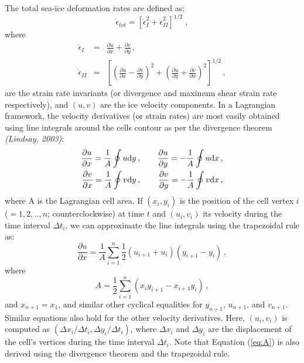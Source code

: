 \documentclass[12pt]{article}
\begin{document}
The total sea-ice deformation rates are defined as:
\begin{equation}
\dot{\epsilon}_{tot} = \left[ \dot{\epsilon}^2_{I}+\dot{\epsilon}^2_{II} \right]^{1/2} \;,
\end{equation}
where 
\begin{eqnarray}
\dot{\epsilon}_{I} &= &\frac{\partial u}{\partial x}+\frac{\partial v}{\partial y} \, , \label{eq:eps_I} \\
\dot{\epsilon}_{II} &= &\left[ \left( \frac{\partial u}{\partial x} - \frac{\partial v}{\partial y}\right)^{2} + \left( \frac{\partial u}{\partial y} + \frac{\partial v}{\partial x}\right)^{2}   \right]^{1/2} \, , \label{eq:eps_II} 
\end{eqnarray}
are the strain rate invariants (or divergence and maximum shear strain rate respectively), and $(u,v)$ are the ice velocity components. In a Lagrangian framework, the velocity derivatives (or strain rates) are most easily obtained using line integrals around the cells contour as per the divergence theorem \textit{(Lindsay, 2003)}: 
\begin{eqnarray}
\frac{\partial u}{\partial x}  = \frac{1}{A}\oint u \textrm{d}y \, ,&  \hspace{0.4cm} & \frac{\partial u}{\partial y}  = -\frac{1}{A}\oint u \textrm{d}x \, , \nonumber \\
\frac{\partial v}{\partial x}  = \frac{1}{A}\oint v \textrm{d}y \, ,&  \hspace{0.4cm}  & \frac{\partial v}{\partial y}  = -\frac{1}{A}\oint v \textrm{d}x\, ,
\label{eq:dudx}
\end{eqnarray}
where A is the Lagrangian cell area. If $(x_{i}, y_{i})$ is the position of the cell vertex $i$ ($=1,2,..,n$; counterclockwise) at time $t$ and $(u_{i}, v_{i})$ its velocity during the time interval $\Delta t_{i}$, we can approximate the line integrals using the trapezoidal rule as:
\begin{equation}
\frac{\partial u}{\partial x}  = \frac{1}{A}\sum_{i=1}^{n}\frac{1}{2}\left( u_{i+1} + u_{i} \right)\left( y_{i+1} - y_{i} \right) \, ,
\label{eq:dudx_sum}
\end{equation}
 where
 \begin{equation}
 A = \frac{1}{2}\sum_{i=1}^{n}\left( x_{i}y_{i+1} -  x_{i+1}y_{i} \right)\, ,
\label{eq:A}
 \end{equation}
and $x_{n+1} = x_1$, and similar other cyclical equalities for $y_{n+1}$, $u_{n+1}$, and $v_{n+1}$. Similar equations also hold for the other velocity derivatives. Here, $(u_{i},v_{i})$ is computed as $(\Delta x_{i}/\Delta t_{i}, \Delta y_{i}/\Delta t_{i})$, where $\Delta x_{i}$ and $\Delta y_{i}$ are the displacement of the cell's vertices during the time interval $\Delta t_{i}$. Note that Equation (\ref{eq:A}) is also derived using the divergence theorem and the trapezoidal rule.
\end{document}

